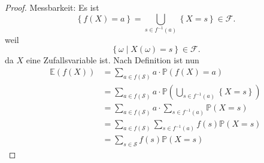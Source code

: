 \begin{proof}
    Messbarkeit: Es ist
    \[
        \left \{f(X) = a\right\}  = \bigcup_{s\in f^{-1}(a)} \left \{X=s\right\}  \in \mathcal{F}
    .\] 
    weil
    \[
        \left \{\omega \mid  X(\omega) = s\right\} \in \mathcal{F}
    .\] 
    da $X$ eine Zufallsvariable ist. Nach Definition ist nun
    \begin{equation*}
        \begin{split}
            \mathbb{E}(f(X)) &= \sum_{a\in f(\mathcal{S})} a\cdot \mathbb{P}(f(X)=a) \\
                             &= \sum_{a\in f(\mathcal{S})} a\cdot \mathbb{P}\left( \bigcup_{s\in f^{-1}(a)} \left \{X=s\right\}   \right) \\
                             &=\sum_{a\in f(\mathcal{S})} a\cdot \sum_{s\in f^{-1}(a)} \mathbb{P}(X=s) \\
                             &=\sum_{a\in f(\mathcal{S})} \sum_{s\in f^{-1}(a)} f(s) \mathbb{P}(X=s) \\
                             &= \sum_{s\in \mathcal{S}} f(s) \mathbb{P}(X=s)
        \end{split}
    \end{equation*}
\end{proof}

